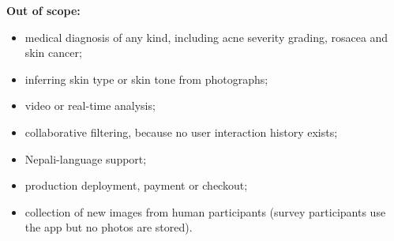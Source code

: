\textbf{Out of scope:}
\begin{itemize}
  \item medical diagnosis of any kind, including acne severity grading, rosacea and skin cancer;
  \item inferring skin type or skin tone from photographs;
  \item video or real-time analysis;
  \item collaborative filtering, because no user interaction history exists;
  \item Nepali-language support;
  \item production deployment, payment or checkout;
  \item collection of new images from human participants (survey participants use the app but no photos are stored).
\end{itemize}
